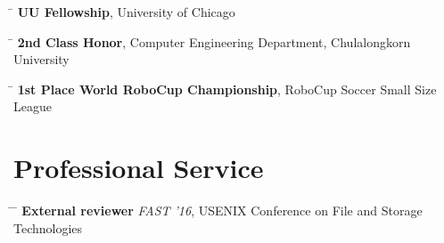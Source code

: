 \documentclass[10pt]{article} %
\begin{document}


\begin{tabbing}
\hspace{2.5cm} \=  \> \textbf{UU Fellowship}, University of Chicago
\end{tabbing}

\begin{tabbing}
\hspace{2.5cm} \=  \> \textbf{2nd Class Honor}, Computer Engineering Department, Chulalongkorn University
\end{tabbing}

\begin{tabbing}
\hspace{2.5cm} \=  \> \textbf{1st Place World RoboCup Championship}, RoboCup Soccer Small Size League
\end{tabbing}




\section{Professional Service}

\begin{tabbing}
\hspace{2.5cm} \= \hspace{3.5cm}  \=  \> \textbf{External reviewer} \> \textit{FAST '16}, USENIX Conference on File and Storage Technologies
\end{tabbing}

\end{document}
